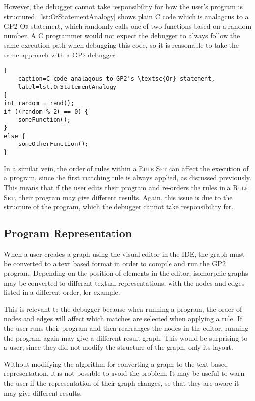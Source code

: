 \documentclass[authoryearcitations]{UoYCSproject}
\begin{document}
However, the debugger cannot take responsibility for how the user's program
is structured. \autoref{lst:OrStatementAnalogy} shows plain C code which is
analagous to a GP2 \textsc{Or} statement, which randomly calls one of two
functions based on a random number. A C programmer would not expect the
debugger to always follow the same execution path when debugging this code,
so it is reasonable to take the same approach with a GP2 debugger.

\begin{lstlisting}[
    caption=C code analagous to GP2's \textsc{Or} statement,
    label=lst:OrStatementAnalogy
]
int random = rand();
if ((random % 2) == 0) {
    someFunction();
}
else {
    someOtherFunction();
}
\end{lstlisting}

In a similar vein, the order of rules within a \textsc{Rule Set} can affect the
execution of a program, since the first matching rule is always applied, as
discussed previously. This means that if the user edits their program and
re-orders the rules in a \textsc{Rule Set}, their program may give different
results. Again, this issue is due to the structure of the program, which the
debugger cannot take responsibility for.


\subsection{Program Representation}
\label{sec:ProgramRepresentation}

When a user creates a graph using the visual editor in the IDE, the graph must
be converted to a text based format in order to compile and run the GP2 program.
Depending on the position of elements in the editor, isomorphic graphs may be
converted to different textual representations, with the nodes and edges listed
in a different order, for example.

This is relevant to the debugger because when running a program, the order of
nodes and edges will affect which matches are selected when applying a rule. If
the user runs their program and then rearranges the nodes in the editor, running
the program again may give a different result graph. This would be surprising to
a user, since they did not modify the structure of the graph, only its layout.

Without modifying the algorithm for converting a graph to the text based
representation, it is not possible to avoid the problem. It may be
useful to warn the user if the representation of their graph changes, so that
they are aware it may give different results.
\end{document}
